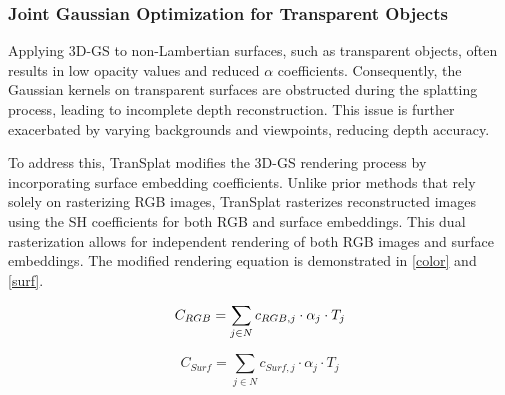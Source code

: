 \subsubsection{Joint Gaussian Optimization for Transparent Objects}

Applying \ac{3D-GS} to non-Lambertian surfaces, such as transparent objects, often results in low opacity values and reduced $\alpha$ coefficients. Consequently, the Gaussian kernels on transparent surfaces are obstructed during the splatting process, leading to incomplete depth reconstruction. This issue is further exacerbated by varying backgrounds and viewpoints, reducing depth accuracy.

To address this, TranSplat modifies the \ac{3D-GS} rendering process by incorporating surface embedding coefficients. Unlike prior methods that rely solely on rasterizing RGB images, TranSplat rasterizes reconstructed images using the \ac{SH} coefficients for both RGB and surface embeddings. This dual rasterization allows for independent rendering of both RGB images and surface embeddings. The modified rendering equation is demonstrated in  \eqref{color} and \eqref{surf}.






\begin{equation}
C_{RGB} = \sum_{j \in N} c_{RGB, j} \cdot \alpha_{j} \cdot T_j
\label{color}
\vspace{-2mm}
\end{equation}

\begin{equation}
C_{Surf} = \sum_{j \in N} c_{Surf, j} \cdot \alpha_{j} \cdot T_j
\label{surf}
\end{equation}

